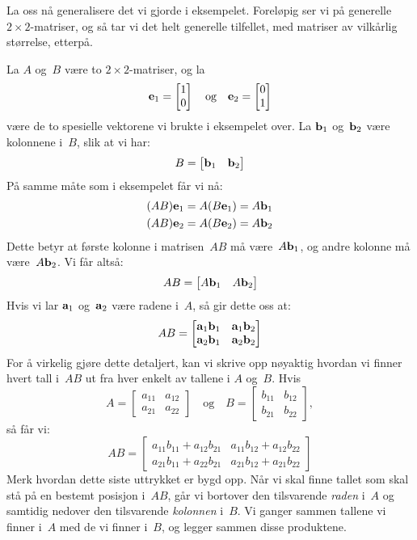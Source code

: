 La oss nå generalisere det vi gjorde i eksempelet.  Foreløpig ser vi
på generelle $2 \times 2$-matriser, og så tar vi det helt generelle
tilfellet, med matriser av vilkårlig størrelse, etterpå.

La $A$ og~$B$ være to $2 \times 2$-matriser, og la
\[
\mathbf{e}_1 = \begin{bmatrix} 1 \\ 0 \end{bmatrix}
\quad\text{og}\quad
\mathbf{e}_2 = \begin{bmatrix} 0 \\ 1 \end{bmatrix}
\]
være de to spesielle vektorene vi brukte i eksempelet over.  La
$\mathbf{b}_1$ og~$\mathbf{b}_2$ være kolonnene i~$B$, slik at vi har:
\[
B = \begin{bmatrix} \mathbf{b}_1 & \mathbf{b}_2 \end{bmatrix}
\]
På samme måte som i eksempelet får vi nå:
\begin{align*}
(AB) \mathbf{e}_1
&= A (B \mathbf{e}_1)
 = A \mathbf{b}_1 \\
(AB) \mathbf{e}_2
&= A (B \mathbf{e}_2)
 = A \mathbf{b}_2 \\
\end{align*}
Dette betyr at første kolonne i matrisen~$AB$ må være~$A \mathbf{b}_1$, og
andre kolonne må være~$A \mathbf{b}_2$.  Vi får altså:
\[
AB = \begin{bmatrix} A \mathbf{b}_1 & A \mathbf{b}_2 \end{bmatrix}
\]
Hvis vi lar $\mathbf{a}_1$ og~$\mathbf{a}_2$ være radene i~$A$, så gir dette oss
at:
\[
AB =
\begin{bmatrix}
\mathbf{a}_1 \mathbf{b}_1 & \mathbf{a}_1 \mathbf{b}_2 \\
\mathbf{a}_2 \mathbf{b}_1 & \mathbf{a}_2 \mathbf{b}_2
\end{bmatrix}
\]
For å virkelig gjøre dette detaljert, kan vi skrive opp nøyaktig
hvordan vi finner hvert tall i~$AB$ ut fra hver enkelt av tallene i
$A$ og~$B$.  Hvis
\[
A =
\begin{bmatrix}
a_{11} & a_{12} \\
a_{21} & a_{22}
\end{bmatrix}
\quad\text{og}\quad
B =
\begin{bmatrix}
b_{11} & b_{12} \\
b_{21} & b_{22}
\end{bmatrix},
\]
så får vi:
\[
AB =
\begin{bmatrix}
a_{11} b_{11} + a_{12} b_{21} & a_{11} b_{12} + a_{12} b_{22} \\
a_{21} b_{11} + a_{22} b_{21} & a_{21} b_{12} + a_{21} b_{22}
\end{bmatrix}
\]
Merk hvordan dette siste uttrykket er bygd opp.  Når vi skal finne
tallet som skal stå på en bestemt posisjon i~$AB$, går vi bortover den
tilsvarende \emph{raden} i~$A$ og samtidig nedover den tilsvarende
\emph{kolonnen} i~$B$.  Vi ganger sammen tallene vi finner i~$A$ med
de vi finner i~$B$, og legger sammen disse produktene.

